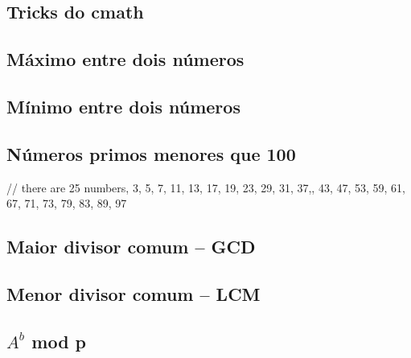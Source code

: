 \documentclass[a4paper,12pt]{article}
\begin{document}

\subsection{Tricks do cmath}


\subsection{Máximo entre dois números}


\subsection{Mínimo entre dois números}


\subsection{Números primos menores que 100}

// there are 25 numbers, 3, 5, 7, 11, 13, 17, 19, 23, 29, 31, 37,, 43, 47, 53, 59, 61, 67, 71, 73, 79, 83, 89, 97

\subsection{Maior divisor comum – GCD}


\subsection{Menor divisor comum – LCM}


\subsection{$A^b$ mod p}

\end{document}
